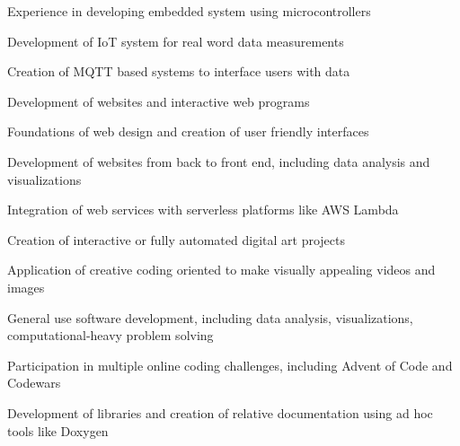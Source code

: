 \documentclass[]{plushcv}
\begin{document}
\begin{minipage}[t]{0.60\textwidth}
\begin{tightemize}
\item Experience in developing embedded system using microcontrollers
\item Development of IoT system for real word data measurements
\item Creation of MQTT based systems to interface users with data
\end{tightemize}
\sectionsep

\begin{tightemize}
\item Development of websites and interactive web programs
\item Foundations of web design and creation of user friendly interfaces
\end{tightemize}
\sectionsep

\begin{tightemize}
\item Development of websites from back to front end, including data analysis and visualizations
\item Integration of web services with serverless platforms like AWS Lambda
\end{tightemize}
\sectionsep

\begin{tightemize}
\item Creation of interactive or fully automated digital art projects
\item Application of creative coding oriented to make visually appealing videos and images
\end{tightemize}
\sectionsep

\begin{tightemize}
\item General use software development, including data analysis, visualizations, computational-heavy problem solving
\item Participation in multiple online coding challenges, including Advent of Code and Codewars
\item Development of libraries and creation of relative documentation using ad hoc tools like Doxygen
\end{tightemize}
\sectionsep


\end{minipage}
\end{document}
